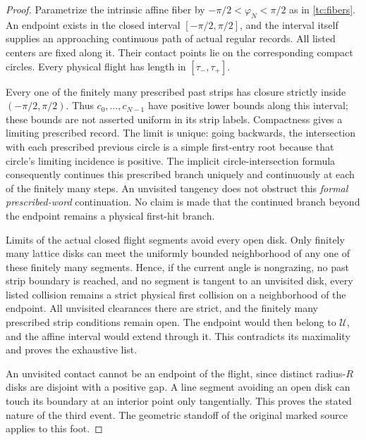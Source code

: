 \begin{proof}
Parametrize the intrinsic affine fiber by
$-\pi/2<\varphi_N<\pi/2$ as in \eqref{tc:fibers}.
An endpoint exists in the closed interval
$[-\pi/2,\pi/2]$, and the interval itself supplies an approaching
continuous path of actual regular records.  All listed centers are
fixed along it.  Their contact points lie on the corresponding
compact circles.  Every physical flight has length in
$[\tau_-,\tau_+]$.

Every one of the finitely many prescribed past strips has closure
strictly inside $(-\pi/2,\pi/2)$.  Thus
$c_0,\ldots,c_{N-1}$ have positive lower bounds along this interval;
these bounds are not asserted uniform in its strip labels.
Compactness gives a limiting prescribed record.  The limit is
unique: going backwards, the intersection with each prescribed
previous circle is a simple first-entry root because that circle's
limiting incidence is positive.  The implicit circle-intersection
formula consequently continues this prescribed branch uniquely
and continuously at each of the finitely many steps.  An unvisited
tangency does not obstruct this \emph{formal prescribed-word}
continuation.  No claim is made that the continued branch beyond
the endpoint remains a physical first-hit branch.

Limits of the actual closed flight segments avoid every open disk.
Only finitely many lattice disks can meet the uniformly bounded
neighborhood of any one of these finitely many segments.  Hence,
if the current angle is nongrazing, no past strip boundary is
reached, and no segment is tangent to an unvisited disk, every
listed collision remains a strict physical first collision on a
neighborhood of the endpoint.  All unvisited clearances there are
strict, and the finitely many prescribed strip conditions remain
open.  The endpoint would then belong to $\mathcal U$, and the
affine interval would extend through it.  This contradicts its
maximality and proves the exhaustive list.

An unvisited contact cannot be an endpoint of the flight, since
distinct radius-$R$ disks are disjoint with a positive gap.
A line segment avoiding an open disk can touch its boundary at an
interior point only tangentially.  This proves the stated nature
of the third event.  The geometric standoff of the original marked
source applies to this foot.


\end{proof}
